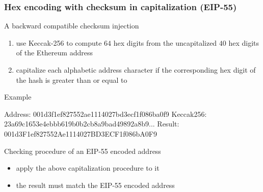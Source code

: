 \documentclass[11pt]{beamer}  %
\def\codesize{\smaller}
\def\<#1>{\codeid{#1}}
\newcommand{\codeid}[1]{\ifmmode{\mbox{\codesize\ttfamily{#1}}}\else{\codesize\ttfamily #1}\fi}
\begin{document}
\begin{frame}[fragile]\frametitle{Hex encoding with checksum in capitalization (EIP-55)}

  \begin{greenbox}{A backward compatible checksum injection}
    \begin{enumerate}
    \item use Keccak-256 to compute $64$ hex digits from the uncapitalized $40$ hex digits of the Ethereum address
    \item capitalize each alphabetic address character if the corresponding hex digit
      of the hash is greater than or equal to \<0x8>
    \end{enumerate}
  \end{greenbox}

  \bigskip

  \begin{greenbox}{Example}
\begin{semiverbatim}
Address:   001d3{\color{purple}f}1ef827552{\color{purple}a}e1114027{\color{purple}bd}3{\color{purple}ecf}1f086b{\color{purple}a}0{\color{purple}f}9
Keccak256: 23a69{\color{blue}c}1653e4ebb{\color{blue}b}619b0b2c{\color{blue}b8}a{\color{blue}9ba}d49892{\color{blue}a}8{\color{blue}b}9...
Result:    001d3{\color{red}F}1ef827552{\color{red}A}e1114027{\color{red}BD}3{\color{red}ECF}1f086b{\color{red}A}0{\color{red}F}9
\end{semiverbatim}
  \end{greenbox}

  \bigskip

  \begin{greenbox}{Checking procedure of an EIP-55 encoded address}
    \begin{itemize}
    \item apply the above capitalization procedure to it
    \item the result must match the EIP-55 encoded address
    \end{itemize}
  \end{greenbox}

\end{frame}
\end{document}
